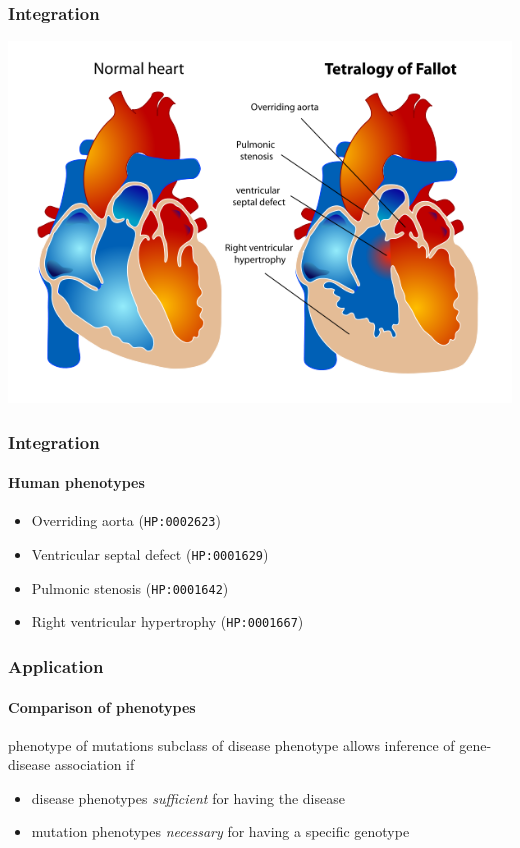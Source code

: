 \documentclass{beamer}
\renewcommand{\em}{\itshape}
\begin{document}
\begin{frame}
  \frametitle{Integration}
  \centerline{\includegraphics[height=.8\textheight]{tetralogy.png}}
\end{frame}

\begin{frame}
  \frametitle{Integration}
  \framesubtitle{Human phenotypes}
  \begin{itemize}
  \item Overriding aorta ({\tt HP:0002623})
  \item Ventricular septal defect ({\tt HP:0001629})
  \item Pulmonic stenosis ({\tt HP:0001642})
  \item Right ventricular hypertrophy ({\tt HP:0001667})
  \end{itemize}
\end{frame}

\begin{frame}
  \frametitle{Application}
  \framesubtitle{Comparison of phenotypes}
  phenotype of mutations subclass of disease phenotype allows
  inference of gene-disease association if
  \begin{itemize}
  \item disease phenotypes {\em sufficient} for having the disease
  \item mutation phenotypes {\em necessary} for having a specific
    genotype
  \end{itemize}
\end{frame}
\end{document}
